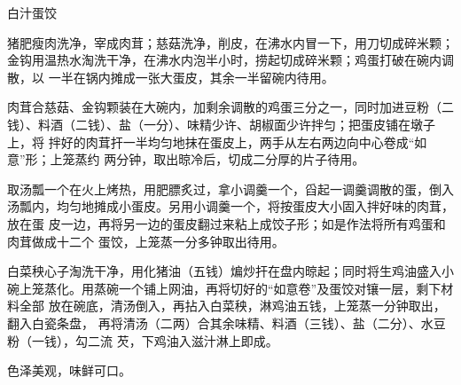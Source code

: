 \begin{recipe}[如意蛋饺]{白汁蛋饺}

\ingredients


\preparation

\step 猪肥瘦肉洗净，宰成肉茸；慈菇洗净，削皮，在沸水内冒一下，用刀切成碎米颗；
金钩用温热水淘洗干净，在沸水内泡半小时，捞起切成碎米颗；鸡蛋打破在碗内调散，以
一半在锅内摊成一张大蛋皮，其余一半留碗内待用。

\step 肉茸合慈菇、金钩颗装在大碗内，加剩余调散的鸡蛋三分之一，同时加进豆粉（二
钱）、料酒（二钱）、盐（一分）、味精少许、胡椒面少许拌匀；把蛋皮铺在墩子上，将
拌好的肉茸扞一半均匀地抹在蛋皮上，两手从左右两边向中心卷成“如意”形；上笼蒸约
两分钟，取出晾冷后，切成二分厚的片子待用。

\step 取汤瓢一个在火上烤热，用肥膘炙过，拿小调羹一个，舀起一调羹调散的蛋，倒入
汤瓢内，均匀地摊成小蛋皮。另用小调羹一个，将按蛋皮大小固入拌好味的肉茸，放在蛋
皮一边，再将另一边的蛋皮翻过来粘上成饺子形；如是作法将所有鸡蛋和肉茸做成十二个
蛋饺，上笼蒸一分多钟取出待用。

\step 白菜秧心子淘洗干净，用化猪油（五钱）煸炒扞在盘内晾起；同时将生鸡油盛入小
碗上笼蒸化。用蒸碗一个铺上网油，再将切好的“如意卷”及蛋饺对镶一层，剩下材料全部
放在碗底，清汤倒入，再拈入白菜秧，淋鸡油五钱，上笼蒸一分钟取出，翻入白瓷条盘，
再将清汤（二两）合其余味精、料酒（三钱）、盐（二分）、水豆粉（一钱），勾二流
芡，下鸡油入滋汁淋上即成。

\features

色泽美观，味鲜可口。

\end{recipe}

